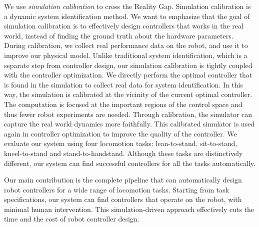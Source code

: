 We use \emph{simulation calibration} to cross the Reality Gap. Simulation calibration is a dynamic system identification method. We want to emphasize that the goal of simulation calibration is to effectively design controllers that works in the real world, instead of finding the ground truth about the hardware parameters. During calibration, we collect real performance data on the robot, and use it to improve our physical model. Unlike traditional system identification, which is a separate step from controller design, our simulation calibration is tightly coupled with the controller optimization. We directly perform the optimal controller that is found in the simulation to collect real data for system identification. In this way, the simulation is calibrated at the vicinity of the current optimal controller. The computation is focused at the important regions of the control space and thus fewer robot experiments are needed. Through calibration, the simulator can capture the real world dynamics more faithfully. This calibrated simulator is used again in controller optimization to improve the quality of the controller. We evaluate our system using four locomotion tasks: lean-to-stand, sit-to-stand, kneel-to-stand and stand-to-handstand. Although these tasks are distinctively different, our system can find successful controllers for all the tasks automatically.

Our main contribution is the complete pipeline that can automatically design robot controllers for a wide range of locomotion tasks. Starting from task specifications, our system can find controllers that operate on the robot, with minimal human intervention. This simulation-driven approach effectively cuts the time and the cost of robot controller design. 
